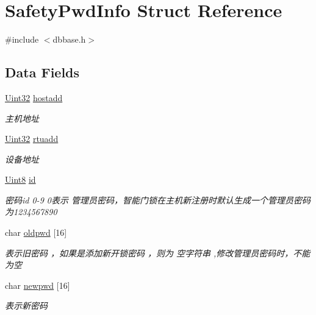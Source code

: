 \hypertarget{structSafetyPwdInfo}{\section{Safety\-Pwd\-Info Struct Reference}
\label{structSafetyPwdInfo}
}


{\ttfamily \#include $<$dbbase.\-h$>$}

\subsection*{Data Fields}
\begin{DoxyCompactItemize}
\item 
\hyperlink{base_8h_a60cf7b3c038ce37a50796e8eaddf0b5f}{Uint32} \hyperlink{structSafetyPwdInfo_a8a63934b72944509aa82673a927cfc71}{hostadd}
\begin{DoxyCompactList}\small\item\em 主机地址 \end{DoxyCompactList}\item 
\hyperlink{base_8h_a60cf7b3c038ce37a50796e8eaddf0b5f}{Uint32} \hyperlink{structSafetyPwdInfo_a4ac6a0e4ac9b9b19a2c8d5f1b47b822c}{rtuadd}
\begin{DoxyCompactList}\small\item\em 设备地址 \end{DoxyCompactList}\item 
\hyperlink{base_8h_af84840501dec18061d18a68c162a8fa2}{Uint8} \hyperlink{structSafetyPwdInfo_a8938447ca6c73166e69798de5cca1547}{id}
\begin{DoxyCompactList}\small\item\em 密码id 0-\/9 0表示 管理员密码，智能门锁在主机新注册时默认生成一个管理员密码为1234567890 \end{DoxyCompactList}\item 
char \hyperlink{structSafetyPwdInfo_a0f10f1bb0eca709fc945b4aff9bbe262}{oldpwd} \mbox{[}16\mbox{]}
\begin{DoxyCompactList}\small\item\em 表示旧密码 ，如果是添加新开锁密码 ，则为 空字符串 ,修改管理员密码时，不能为空 \end{DoxyCompactList}\item 
char \hyperlink{structSafetyPwdInfo_a1fec5794b06d5a0f401593930d7254b5}{newpwd} \mbox{[}16\mbox{]}
\begin{DoxyCompactList}\small\item\em 表示新密码 \end{DoxyCompactList}\end{DoxyCompactItemize}



